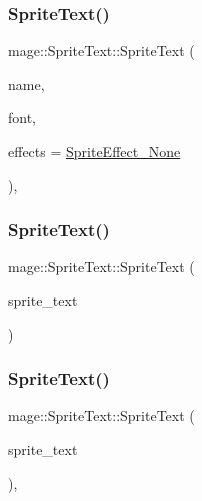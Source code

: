 \subsubsection{\texorpdfstring{Sprite\+Text()}{SpriteText()}\hspace{0.1cm}{\footnotesize\ttfamily [1/3]}}
{\footnotesize\ttfamily mage\+::\+Sprite\+Text\+::\+Sprite\+Text (\begin{DoxyParamCaption}\item[{const string \&}]{name,  }\item[{\hyperlink{namespacemage_a1e01ae66713838a7a67d30e44c67703e}{Shared\+Ptr}$<$ \hyperlink{classmage_1_1_sprite_font}{Sprite\+Font} $>$}]{font,  }\item[{\hyperlink{namespacemage_a9cfe18123066ba4236f548f9de75d881}{Sprite\+Effect}}]{effects = {\ttfamily \hyperlink{namespacemage_a9cfe18123066ba4236f548f9de75d881af3c275fbfacfe174da928b2f24dfa515}{Sprite\+Effect\+\_\+\+None}} }\end{DoxyParamCaption})\hspace{0.3cm}{\ttfamily [explicit]}, {\ttfamily [protected]}}

\hypertarget{classmage_1_1_sprite_text_a3e56a7882dd714a6d8f2452d4f7071ff}{}\label{classmage_1_1_sprite_text_a3e56a7882dd714a6d8f2452d4f7071ff} 
\subsubsection{\texorpdfstring{Sprite\+Text()}{SpriteText()}\hspace{0.1cm}{\footnotesize\ttfamily [2/3]}}
{\footnotesize\ttfamily mage\+::\+Sprite\+Text\+::\+Sprite\+Text (\begin{DoxyParamCaption}\item[{const \hyperlink{classmage_1_1_sprite_text}{Sprite\+Text} \&}]{sprite\+\_\+text }\end{DoxyParamCaption})\hspace{0.3cm}{\ttfamily [protected]}}

\hypertarget{classmage_1_1_sprite_text_ab569dfa4ff5a30f0a23005c43635aad7}{}\label{classmage_1_1_sprite_text_ab569dfa4ff5a30f0a23005c43635aad7} 
\subsubsection{\texorpdfstring{Sprite\+Text()}{SpriteText()}\hspace{0.1cm}{\footnotesize\ttfamily [3/3]}}
{\footnotesize\ttfamily mage\+::\+Sprite\+Text\+::\+Sprite\+Text (\begin{DoxyParamCaption}\item[{\hyperlink{classmage_1_1_sprite_text}{Sprite\+Text} \&\&}]{sprite\+\_\+text }\end{DoxyParamCaption})\hspace{0.3cm}{\ttfamily [protected]}, {\ttfamily [default]}}



